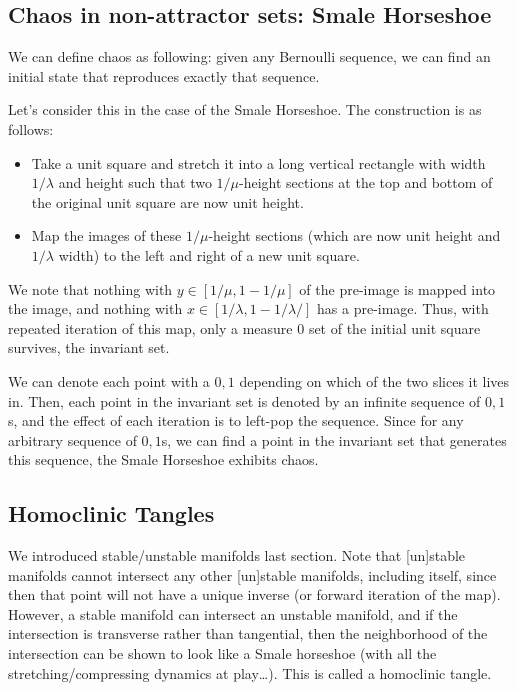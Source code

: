 \documentclass[12pt]{article}
\begin{document}
\subsection{Chaos in non-attractor sets: Smale Horseshoe}

We can define chaos as following: given any Bernoulli sequence, we can find an
initial state that reproduces exactly that sequence.

Let's consider this in the case of the Smale Horseshoe. The construction is as
follows:
\begin{itemize}
    \item Take a unit square and stretch it into a long vertical rectangle with
        width $1/\lambda$ and height such that two $1/\mu$-height sections at
        the top and bottom of the original unit square are now unit height.

    \item Map the images of these $1/\mu$-height sections (which are now unit
        height and $1/\lambda$ width) to the left and right of a new unit
        square.
\end{itemize}

We note that nothing with $y \in [1/\mu, 1-1/\mu]$ of the pre-image is mapped
into the image, and nothing with $x \in [1/\lambda, 1-1/\lambda/]$ has a
pre-image. Thus, with repeated iteration of this map, only a measure $0$ set of
the initial unit square survives, the invariant set.

We can denote each point with a $0, 1$ depending on which of the two slices it
lives in. Then, each point in the invariant set is denoted by an infinite
sequence of $0,1$s, and the effect of each iteration is to left-pop the sequence.
Since for any arbitrary sequence of $0,1$s, we can find a point in the invariant
set that generates this sequence, the Smale Horseshoe exhibits chaos.

\subsection{Homoclinic Tangles}

We introduced stable/unstable manifolds last section. Note that [un]stable
manifolds cannot intersect any other [un]stable manifolds, including itself,
since then that point will not have a unique inverse (or forward iteration of
the map). However, a stable manifold can intersect an unstable manifold, and if
the intersection is transverse rather than tangential, then the neighborhood of
the intersection can be shown to look like a Smale horseshoe (with all the
stretching/compressing dynamics at play\dots). This is called a homoclinic
tangle.
\end{document}
